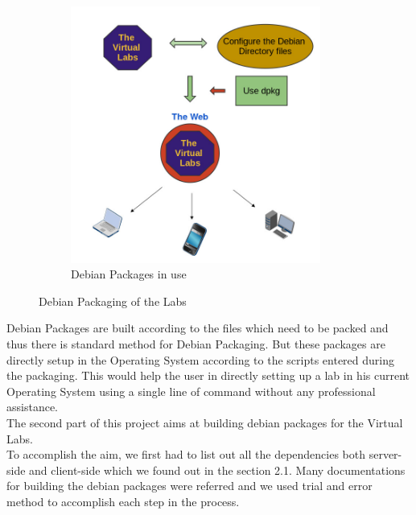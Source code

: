 \documentclass[conference]{IEEEtran}
\begin{document}
\begin{figure}
\begin{subfigure}{\columnwidth}
      \includegraphics[width=0.9\textwidth,height=1.4\textwidth]{debpack}
      \caption{Debian Packages in use}
    \end{subfigure}
    \caption{Debian Packaging of the Labs}
\end{figure}
  Debian Packages are built according to the files which need to be packed and thus there is  standard method for Debian Packaging. But these packages are directly setup in the Operating System according to the scripts entered during the packaging. This would help the user in directly setting up a lab in his current Operating System using a single line of command without any professional assistance.\\ 
  The second part of this project aims at building debian packages for the Virtual Labs.\\
  To accomplish the aim, we first had to list out all the dependencies both server-side and client-side which we found out in the section 2.1. Many documentations for building the debian packages were referred \cite{Debdoc1} \cite{Debdoc2} and we used trial and error method to accomplish each step in the process.\\
\end{document}
